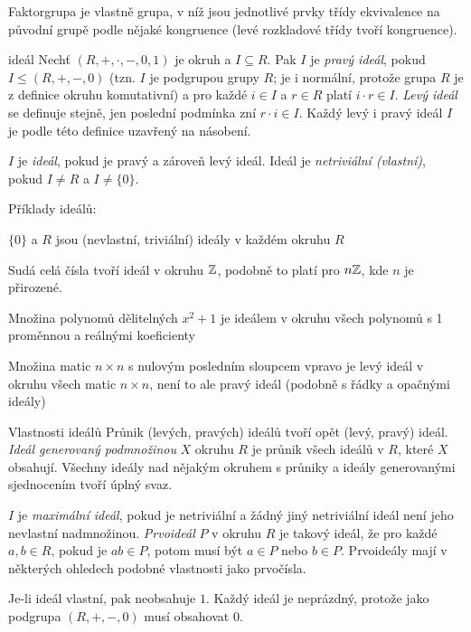 \begin{poznamka}
Faktorgrupa je vlastně grupa, v níž jsou jednotlivé prvky třídy ekvivalence na původní grupě podle nějaké kongruence (levé rozkladové třídy tvoří kongruence).
\end{poznamka}

\begin{definiceN}{ideál}
Nechť $(R,+,\cdot,-,0,1)$ je okruh a $I\subseteq R$. Pak $I$ je \emph{pravý ideál}, pokud $I\leq (R,+,-,0)$ (tzn. $I$ je podgrupou grupy $R$; je i normální, protože grupa $R$ je z definice okruhu komutativní) a pro každé $i\in I$ a $r\in R$ platí $i\cdot r\in I$. \emph{Levý ideál} se definuje stejně, jen poslední podmínka zní $r\cdot i\in I$. Každý levý i pravý ideál $I$ je podle této definice uzavřený na násobení. 

$I$ je \emph{ideál}, pokud je pravý a zároveň levý ideál. Ideál je \emph{netriviální (vlastní)}, pokud $I\neq R$ a $I\neq \{0\}$. 
\end{definiceN}

\begin{priklady}
Příklady ideálů:
\begin{pitemize}
    \item $\{0\}$ a $R$ jsou (nevlastní, triviální) ideály v každém okruhu $R$
    \item Sudá celá čísla tvoří ideál v okruhu $\mathbb{Z}$, podobně to platí pro $n\mathbb{Z}$, kde $n$ je přirozené.
    \item Množina polynomů dělitelných $x^2+1$ je ideálem v okruhu všech polynomů s 1 proměnnou a reálnými koeficienty
    \item Množina matic $n\times n$ s nulovým posledním sloupcem vpravo je levý ideál v okruhu všech matic $n\times n$, není to ale pravý ideál (podobně s řádky a opačnými ideály)
\end{pitemize}
\end{priklady}


\begin{poznamkaN}{Vlastnosti ideálů}
Průnik (levých, pravých) ideálů tvoří opět (levý, pravý) ideál. \emph{Ideál generovaný podmnožinou} $X$ okruhu $R$ je průnik všech ideálů v $R$, které $X$ obsahují. Všechny ideály nad nějakým okruhem s průniky a ideály generovanými sjednocením tvoří úplný svaz.

$I$ je \emph{maximální ideál}, pokud je netriviální a žádný jiný netriviální ideál není jeho nevlastní nadmnožinou. \emph{Prvoideál} $P$ v okruhu $R$ je takový ideál, že pro každé $a,b\in R$, pokud je $ab\in P$, potom musí být $a\in P$ nebo $b\in P$. Prvoideály mají v některých ohledech podobné vlastnosti jako prvočísla.\par
Je-li ideál vlastní, pak neobsahuje $1$. Každý ideál je neprázdný, protože jako podgrupa $(R,+,-,0)$ musí obsahovat $0$. 
\end{poznamkaN}

